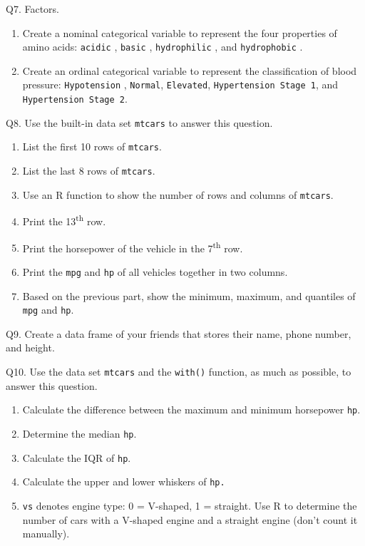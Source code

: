 \documentclass[
  letterpaper,
  DIV=11,
  numbers=noendperiod]{scrreprt}
\begin{document}
Q7. Factors.

\begin{enumerate}
\def\labelenumi{\alph{enumi})}
\item
  Create a nominal categorical variable to represent the four properties
  of amino acids: \texttt{acidic} , \texttt{basic} ,
  \texttt{hydrophilic} , and \texttt{hydrophobic} .
\item
  Create an ordinal categorical variable to represent the classification
  of blood pressure: \texttt{Hypotension} , \texttt{Normal},
  \texttt{Elevated}, \texttt{Hypertension\ Stage\ 1}, and
  \texttt{Hypertension\ Stage\ 2}.
\end{enumerate}

Q8. Use the built-in data set \texttt{mtcars} to answer this question.

\begin{enumerate}
\def\labelenumi{\alph{enumi})}
\item
  List the first 10 rows of \texttt{mtcars}.
\item
  List the last 8 rows of \texttt{mtcars}.
\item
  Use an R function to show the number of rows and columns of
  \texttt{mtcars}.
\item
  Print the 13\textsuperscript{th} row.
\item
  Print the horsepower of the vehicle in the 7\textsuperscript{th} row.
\item
  Print the \texttt{mpg} and \texttt{hp} of all vehicles together in two
  columns.
\item
  Based on the previous part, show the minimum, maximum, and quantiles
  of \texttt{mpg} and \texttt{hp}.
\end{enumerate}

Q9. Create a data frame of your friends that stores their name, phone
number, and height.

Q10. Use the data set \texttt{mtcars} and the \texttt{with()} function,
as much as possible, to answer this question.

\begin{enumerate}
\def\labelenumi{\alph{enumi})}
\item
  Calculate the difference between the maximum and minimum horsepower
  \texttt{hp}.
\item
  Determine the median \texttt{hp}.
\item
  Calculate the IQR of \texttt{hp}.
\item
  Calculate the upper and lower whiskers of \texttt{hp.}
\item
  \texttt{vs} denotes engine type: 0 = V-shaped, 1 = straight. Use R to
  determine the number of cars with a V-shaped engine and a straight
  engine (don't count it manually).
\end{enumerate}
\end{document}

